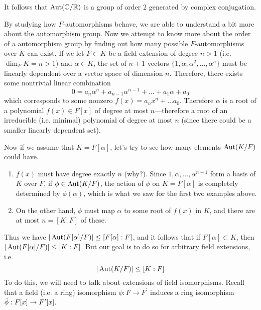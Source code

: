   \begin{example}
    It follows that $\Aut(\mathbb{C}/\mathbb{R})$ is a group of order $2$ generated by complex conjugation. 
  \end{example} 

  By studying how $F$-automorphisms behave, we are able to understand a bit more about the automorphism group. Now we attempt to know more about the order of a automorphism group by finding out how many possible $F$-automorphisms over $K$ can exist. If we let $F \subset K$ be a field extension of degree $n >1$ (i.e. $\dim_F K = n > 1$) and $\alpha \in K$, the set of $n+1$ vectors $\{1, \alpha, \alpha^2, \ldots, \alpha^n\}$ must be linearly dependent over a vector space of dimension $n$. Therefore, there exists some nontrivial linear combination 
  \begin{equation}
    0 = a_n \alpha^n + a_{n-1} \alpha^{n-1} + \ldots + a_1 \alpha + a_0
  \end{equation} 
  which corresponds to some nonzero $f(x) = a_n x^n + \ldots a_0$. Therefore $\alpha$ is a root of a polynomial $f(x) \in F[x]$ of degree at most $n$---therefore a root of an irreducible (i.e. minimal) polynomial of degree at most $n$ (since there could be a smaller linearly dependent set). 

  Now if we assume that $K = F[\alpha]$, let's try to see how many elements $\Aut(K/F)$ could have. 
  \begin{enumerate}
    \item $f(x)$ must have degree exactly $n$ (why?). Since $1, \alpha, \ldots, \alpha^{n-1}$ form a basis of $K$ over $F$, if $\phi \in \Aut(K/F)$, the action of $\phi$ on $K = F[\alpha]$ is completely determined by $\phi(\alpha)$, which is what we saw for the first two examples above. 
    \item On the other hand, $\phi$ must map $\alpha$ to some root of $f(x)$ in $K$, and there are at most $n = [K:F]$ of these. 
  \end{enumerate}
  Thus we have $|\Aut(F[\alpha]/F)| \leq [F[\alpha]:F]$, and it follows that if $F[\alpha] \subset K$, then $|\Aut(F[\alpha]/F)| \leq [K:F]$. But our goal is to do so for arbitrary field extensions, i.e. 
  \begin{equation}
    |\Aut(K/F)| \leq [K:F]
  \end{equation} 
  To do this, we will need to talk about extensions of field isomorphisms. Recall that a field (i.e. a ring) isomorphism $\phi: F \to F^\prime$ induces a ring isomorphism $\Tilde{\phi}: F[x] \to F^\prime [x]$. 


